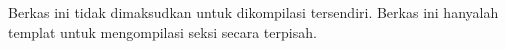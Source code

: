 \documentclass[article]{memoir}
\begin{document}
Berkas ini tidak dimaksudkan untuk dikompilasi tersendiri. Berkas ini
hanyalah templat untuk mengompilasi seksi secara terpisah.
\end{document}
